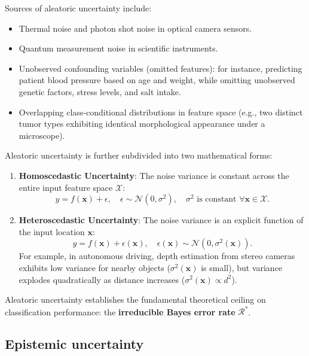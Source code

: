 Sources of aleatoric uncertainty include:
\begin{itemize}[noitemsep]
  \item Thermal noise and photon shot noise in optical camera sensors.
  \item Quantum measurement noise in scientific instruments.
  \item Unobserved confounding variables (omitted features): for instance, predicting patient blood pressure based on age and weight, while omitting unobserved genetic factors, stress levels, and salt intake.
  \item Overlapping class-conditional distributions in feature space (e.g., two distinct tumor types exhibiting identical morphological appearance under a microscope).
\end{itemize}

Aleatoric uncertainty is further subdivided into two mathematical forms:
\begin{enumerate}
  \item \textbf{Homoscedastic Uncertainty}: The noise variance is constant across the entire input feature space $\mathcal{X}$:
  \begin{equation}
  y = f(\mathbf{x}) + \epsilon, \quad \epsilon \sim \mathcal{N}(0, \sigma^2), \quad \sigma^2 \text{ is constant } \forall \mathbf{x} \in \mathcal{X}.
  \end{equation}
  \item \textbf{Heteroscedastic Uncertainty}: The noise variance is an explicit function of the input location $\mathbf{x}$:
  \begin{equation}
  y = f(\mathbf{x}) + \epsilon(\mathbf{x}), \quad \epsilon(\mathbf{x}) \sim \mathcal{N}(0, \sigma^2(\mathbf{x})).
  \end{equation}
  For example, in autonomous driving, depth estimation from stereo cameras exhibits low variance for nearby objects ($\sigma^2(\mathbf{x})$ is small), but variance explodes quadratically as distance increases ($\sigma^2(\mathbf{x}) \propto d^2$).
\end{enumerate}
Aleatoric uncertainty establishes the fundamental theoretical ceiling on classification performance: the \textbf{irreducible Bayes error rate} $\mathcal{R}^*$.

\subsection{Epistemic uncertainty}
\label{sec:epistemic_uncertainty}


